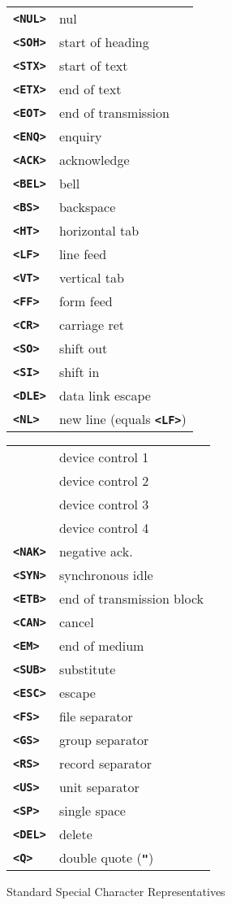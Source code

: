 \documentclass[12pt]{article}
\makeatletter
\newcommand{\TT}[1]{{\tt \bfseries #1}}
\newcommand{\tttkey}[1]{\TT{<#1>}\index{#1@{\tt <#1>}}}
\newlength{\figurewidth}
\newenvironment{boxedfigure}[1][!btp]%
	{\begin{figure*}[#1]
	 \begin{lrbox}{\figurebox}
	 \begin{minipage}{\figurewidth}

	 \vspace*{1ex}}%
	{
	 \vspace*{1ex}

	 \end{minipage}
	 \end{lrbox}
	 \begin{center}
	 \fbox{\hspace*{0.1in}\usebox{\figurebox}\hspace*{0.1in}}
	 \end{center}
	 \end{figure*}}
\makeatother
\begin{document}
\begin{boxedfigure}[!t]

\begin{center}
\begin{tabular}{lp{2in}}
\tttkey{NUL} & nul \\
\tttkey{SOH} & start of heading \\
\tttkey{STX} & start of text \\
\tttkey{ETX} & end of text \\
\tttkey{EOT} & end of transmission \\
\tttkey{ENQ} & enquiry \\
\tttkey{ACK} & acknowledge \\
\tttkey{BEL} & bell \\
\tttkey{BS}  & backspace \\
\tttkey{HT}  & horizontal tab \\
\tttkey{LF}  & line feed \\
\tttkey{VT}  & vertical tab \\
\tttkey{FF}  & form feed \\
\tttkey{CR}  & carriage ret \\
\tttkey{SO}  & shift out \\
\tttkey{SI}  & shift in \\
\tttkey{DLE} & data link escape
\\[1ex]
\tttkey{NL}  & new line (equals \TT{<LF>}) \\
\end{tabular}
\begin{tabular}{lp{2in}}
\tttkey{DC1} & device control 1 \\
\tttkey{DC2} & device control 2 \\
\tttkey{DC3} & device control 3 \\
\tttkey{DC4} & device control 4 \\
\tttkey{NAK} & negative ack. \\
\tttkey{SYN} & synchronous idle \\
\tttkey{ETB} & end of transmission block \\
\tttkey{CAN} & cancel \\
\tttkey{EM}  & end of medium \\
\tttkey{SUB} & substitute \\
\tttkey{ESC} & escape \\
\tttkey{FS}  & file separator \\
\tttkey{GS}  & group separator \\
\tttkey{RS}  & record separator \\
\tttkey{US}  & unit separator \\
\tttkey{SP}  & single space \\
\tttkey{DEL} & delete
\\[1ex]
\tttkey{Q}  & double quote (\TT{"}) \\
\end{tabular}
\end{center}

\caption{Standard Special Character Representatives}
\label{STANDARD-SPECIAL-CHARACTER-REPRESENTATIVES}
\end{boxedfigure}
\end{document}
